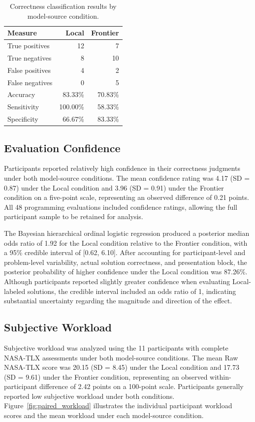 \documentclass[manuscript,review]{acmart}
\begin{document}
\begin{table}[htbp]
    \centering
    \caption{Correctness classification results by model-source condition.}
    \label{tab:classification_results}
    \begin{tabular}{lrr}
        \toprule
        \textbf{Measure} & \textbf{Local} & \textbf{Frontier} \\
        \midrule
        True positives  & 12 & 7 \\
        True negatives  & 8  & 10 \\
        False positives & 4  & 2 \\
        False negatives & 0  & 5 \\
        \midrule
        Accuracy    & 83.33\% & 70.83\% \\
        Sensitivity & 100.00\% & 58.33\% \\
        Specificity & 66.67\% & 83.33\% \\
        \bottomrule
    \end{tabular}
\end{table}

\subsection{Evaluation Confidence}
Participants reported relatively high confidence in their correctness judgments under both model-source conditions. The mean confidence rating was 4.17 (SD = 0.87) under the Local condition and 3.96 (SD = 0.91) under the Frontier condition on a five-point scale, representing an observed difference of 0.21 points. All 48 programming evaluations included confidence ratings, allowing the full participant sample to be retained for analysis.

The Bayesian hierarchical ordinal logistic regression produced a posterior median odds ratio of 1.92 for the Local condition relative to the Frontier condition, with a 95\% credible interval of [0.62, 6.10]. After accounting for participant-level and problem-level variability, actual solution correctness, and presentation block, the posterior probability of higher confidence under the Local condition was 87.26\%. Although participants reported slightly greater confidence when evaluating Local-labeled solutions, the credible interval included an odds ratio of 1, indicating substantial uncertainty regarding the magnitude and direction of the effect.

\subsection{Subjective Workload}
Subjective workload was analyzed using the 11 participants with complete NASA-TLX assessments under both model-source conditions. The mean Raw NASA-TLX score was 20.15 (SD = 8.45) under the Local condition and 17.73 (SD = 9.61) under the Frontier condition, representing an observed within-participant difference of 2.42 points on a 100-point scale. Participants generally reported low subjective workload under both conditions. Figure~\ref{fig:paired_workload} illustrates the individual participant workload scores and the mean workload under each model-source condition.
\end{document}
